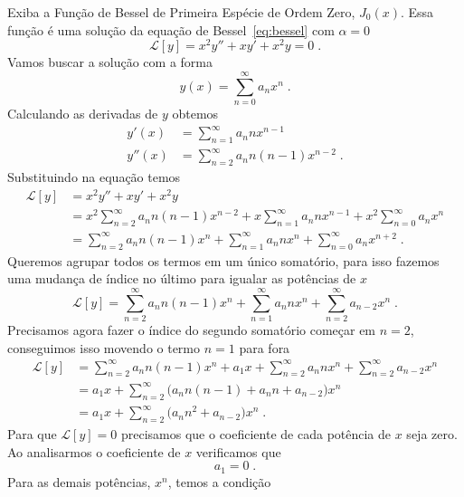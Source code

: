 \begin{example}
  Exiba a Função de Bessel de Primeira Espécie de Ordem Zero, $J_0(x)$.
  \solution
  Essa função é uma solução da equação de Bessel~\eqref{eq:bessel} com
  $\alpha=0$
  \[
    \mathcal{L}[y] = x^2 y'' + xy' + x^2y = 0 \;.
  \]
  Vamos buscar a solução com a forma
  \[
    y(x) = \sum_{n=0}^\infty a_n x^n \;.
  \]
  Calculando as derivadas de $y$ obtemos
  \begin{align*}
    y'(x)  & = \sum_{n=1}^\infty a_n n x^{n-1} \\[3mm]
    y''(x) & = \sum_{n=2}^\infty a_n n(n-1) x^{n-2} \;.
  \end{align*}
  Substituindo na equação temos
  \begin{align*}
    \mathcal{L}[y] & = x^2 y'' + xy' + x^2y \\[3mm]
                   & = x^2 \sum_{n=2}^\infty a_n n(n-1) x^{n-2}
                     + x   \sum_{n=1}^\infty a_n n x^{n-1}
                     + x^2 \sum_{n=0}^\infty a_n x^n
                   \\[3mm]
                   & = \sum_{n=2}^\infty a_n n (n-1) x^n
                     + \sum_{n=1}^\infty a_n n       x^n
                     + \sum_{n=0}^\infty a_n         x^{n+2} \;.
  \end{align*}
  Queremos agrupar todos os termos em um único somatório,
  para isso fazemos uma mudança de índice no último
  para igualar as potências de $x$
  \[
  \mathcal{L}[y] = \sum_{n=2}^\infty a_n n (n-1) x^n
                 + \sum_{n=1}^\infty a_n n       x^n
                 + \sum_{n=2}^\infty a_{n-2}     x^n \;.
  \]
  Precisamos agora fazer o índice do segundo somatório começar em $n=2$,
  conseguimos isso movendo o termo $n=1$ para fora
  \begin{align*}
    \mathcal{L}[y] & =        \sum_{n=2}^\infty a_n n (n-1) x^n
                     + a_1x + \sum_{n=2}^\infty a_n n       x^n
                     +        \sum_{n=2}^\infty a_{n-2}     x^n \\[3mm]
                   & = a_1x + \sum_{n=2}^\infty \big( a_n n (n-1) + a_n n + a_{n-2} \big) x^n \\[3mm]
                   & = a_1x + \sum_{n=2}^\infty \big( a_n n^2 + a_{n-2} \big) x^n \;.
  \end{align*}
  Para que
  \(
    \mathcal{L}[y] = 0
  \)
  precisamos que o coeficiente
  de cada potência de $x$ seja zero. Ao analisarmos o
  coeficiente de $x$ verificamos que
  \[
    a_1 = 0 \;.
  \]
  Para as demais potências, $x^n$, temos a condição

\end{example}
